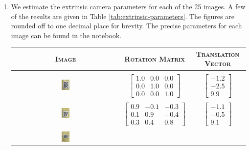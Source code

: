 \documentclass[10pt]{article}
\begin{document}
\begin{enumerate}
        \item We estimate the extrinsic camera parameters for each of the 25 images. A few of
        the results are given in Table \ref{tab:extrinsic-parameters}. The figures are rounded
        off to one decimal place for brevity. The precise parameters for each image can be found
        in the notebook.
        \begin{longtable}{c|c|c}
            \textsc{Image} & \textsc{Rotation Matrix} & \textsc{Translation Vector} \\
            \hline & & \\
            \includegraphics[width=0.075\textwidth, valign=c]{Assets/Camera-Calibration/01.jpg}
            & $\begin{bmatrix}
                1.0 & 0.0 & 0.0 \\
                0.0 & 1.0 & 0.0 \\
                0.0 & 0.0 & 1.0
            \end{bmatrix}$ & $\begin{bmatrix} -1.2 \\ -2.5 \\ 9.9 \end{bmatrix}$ \\
            & & \\
            \includegraphics[width=0.075\textwidth, valign=c]{Assets/Camera-Calibration/02.jpg}
            & $\begin{bmatrix}
                0.9 & -0.1 & -0.3 \\
                0.1 & 0.9 & -0.4 \\
                0.3 & 0.4 & 0.8
            \end{bmatrix}$ & $\begin{bmatrix} -1.1 \\ -0.5 \\ 9.1 \end{bmatrix}$ \\
            & & \\
            \includegraphics[width=0.075\textwidth, valign=c]{Assets/Camera-Calibration/03.jpg}

\end{longtable}
\end{enumerate}
\end{document}
